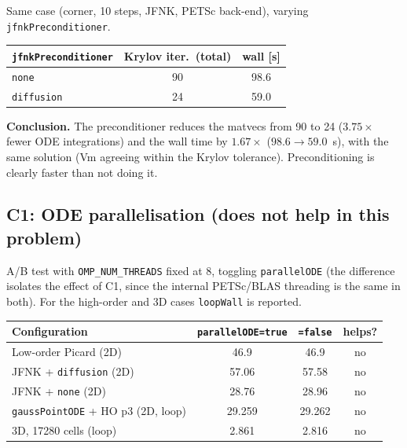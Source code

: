 \documentclass[11pt,a4paper]{article}
\newcommand{\code}[1]{\texttt{\small #1}}
\newcommand{\dictkey}[1]{\textcolor{black!60!green}{\texttt{\footnotesize #1}}}
\begin{document}
Same case (corner, 10 steps, JFNK, PETSc back-end), varying
\dictkey{jfnkPreconditioner}.

\begin{center}
\begin{tabular}{@{}lcc@{}}
\toprule
\dictkey{jfnkPreconditioner} & Krylov iter.\ (total) & wall [s] \\
\midrule
\code{none}      & 90 & 98.6 \\
\code{diffusion} & 24 & 59.0 \\
\bottomrule
\end{tabular}
\end{center}

\noindent\textbf{Conclusion.} The preconditioner reduces the matvecs from 90 to 24
($3.75\times$ fewer ODE integrations) and the wall time by $1.67\times$
($98.6\to59.0$~s), with the same solution (Vm agreeing within the Krylov
tolerance). Preconditioning is clearly faster than not doing it.

\subsection{C1: ODE parallelisation (does not help in this problem)}
\label{sec:exp-C1}

A/B test with \code{OMP\_NUM\_THREADS} fixed at 8, toggling \dictkey{parallelODE}
(the difference isolates the effect of C1, since the internal PETSc/BLAS threading is
the same in both). For the high-order and 3D cases \code{loopWall} is reported.

\begin{center}
\begin{tabular}{@{}lccc@{}}
\toprule
Configuration & \code{parallelODE=true} & \code{=false} & helps? \\
\midrule
Low-order Picard (2D)                  & 46.9  & 46.9  & no \\
JFNK + \code{diffusion} (2D)           & 57.06 & 57.58 & no \\
JFNK + \code{none} (2D)                & 28.76 & 28.96 & no \\
\code{gaussPointODE} + HO p3 (2D, loop)& 29.259 & 29.262 & no \\
3D, \num{17280} cells (loop)           & 2.861 & 2.816 & no \\
\bottomrule
\end{tabular}
\end{center}
\end{document}
